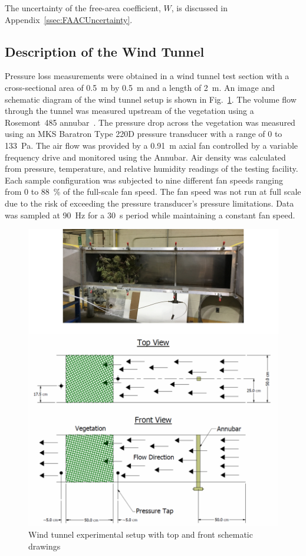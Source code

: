 \documentclass[12pt]{article}
\begin{document}
The uncertainty of the free-area coefficient, $W$, is discussed in Appendix~\ref{ssec:FAACUncertainty}.

\subsection{Description of the Wind Tunnel}
\label{ssec:DescirptionofWind}

Pressure loss measurements were obtained in a wind tunnel test section with a cross-sectional area of 0.5~\si{m} by 0.5~\si{m} and a length of 2~\si{m}. An image and schematic diagram of the wind tunnel setup is shown in Fig.~\ref{fig:WindtunnelPic}. The volume flow through the tunnel was measured upstream of the vegetation using a Rosemont~485 annubar~\cite{Annubar}. The pressure drop across the vegetation was measured using an MKS Baratron Type 220D pressure transducer with a range of 0 to 133~Pa. The air flow was provided by a 0.91~m axial fan controlled by a variable frequency drive and monitored using the Annubar. Air density was calculated from pressure, temperature, and relative humidity readings of the testing facility. Each sample configuration was subjected to nine different fan speeds ranging from 0 to 88~\% of the full-scale fan speed. The fan speed was not run at full scale due to the risk of exceeding the pressure transducer's pressure limitations. Data was sampled at 90~\si{Hz} for a 30~\si{s} period while maintaining a constant fan speed.

\begin{figure} [!]
	\centering
    \includegraphics[width=\textwidth,keepaspectratio]{Picture6a.png}
	\caption[Wind tunnel experimental setup]{Wind tunnel experimental setup with top and front schematic drawings }
	\label{fig:WindtunnelPic}
\end{figure}
\end{document}
